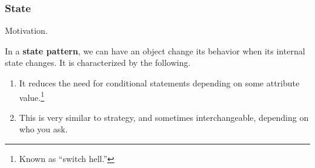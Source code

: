   \subsubsection{State} 

    Motivation. 
    
    \begin{definition}
      \label{def:state-pattern}
      In a \textbf{state pattern}, we can have an object change its behavior when its internal state changes. It is characterized by the following. 
      \begin{enumerate}
        \item It reduces the need for conditional statements depending on some attribute value.\footnote{Known as ``switch hell.''}  
        \item This is very similar to strategy, and sometimes interchangeable, depending on who you ask. 
      \end{enumerate}
    \end{definition}

